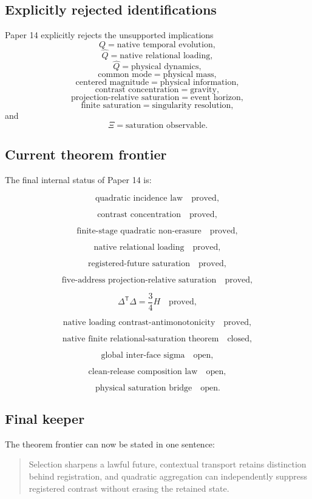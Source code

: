 \subsection{Explicitly rejected identifications}

Paper 14 explicitly rejects the unsupported implications
\[
Q
=
\text{native temporal evolution},
\]
\[
\widehat Q
=
\text{native relational loading},
\]
\[
\widehat Q
=
\text{physical dynamics},
\]
\[
\text{common mode}
=
\text{physical mass},
\]
\[
\text{centered magnitude}
=
\text{physical information},
\]
\[
\text{contrast concentration}
=
\text{gravity},
\]
\[
\text{projection-relative saturation}
=
\text{event horizon},
\]
\[
\text{finite saturation}
=
\text{singularity resolution},
\]
and
\[
\Xi
=
\text{saturation observable}.
\]

\subsection{Current theorem frontier}

The final internal status of Paper 14 is:

\[
\text{quadratic incidence law}
\quad
\text{proved},
\]

\[
\text{contrast concentration}
\quad
\text{proved},
\]

\[
\text{finite-stage quadratic non-erasure}
\quad
\text{proved},
\]

\[
\text{native relational loading}
\quad
\text{proved},
\]

\[
\text{registered-future saturation}
\quad
\text{proved},
\]

\[
\text{five-address projection-relative saturation}
\quad
\text{proved},
\]

\[
\Delta^{\mathsf T}\Delta=\frac34H
\quad
\text{proved},
\]

\[
\text{native loading contrast-antimonotonicity}
\quad
\text{proved},
\]

\[
\text{native finite relational-saturation theorem}
\quad
\text{closed},
\]

\[
\text{global inter-face sigma}
\quad
\text{open},
\]

\[
\text{clean-release composition law}
\quad
\text{open},
\]

\[
\text{physical saturation bridge}
\quad
\text{open}.
\]

\subsection{Final keeper}

The theorem frontier can now be stated in one sentence:

\begin{quote}
Selection sharpens a lawful future, contextual transport retains
distinction behind registration, and quadratic aggregation can
independently suppress registered contrast without erasing the
retained state.
\end{quote}
